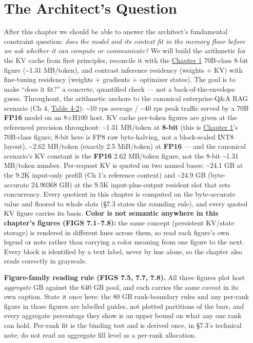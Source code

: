 \section*{The Architect's Question}\label{the-architects-question}

After this chapter we should be able to answer the architect's
fundamental constraint question: \emph{does the model and its context
fit in the memory floor before we ask whether it can compute or
communicate?} We will build the arithmetic for the KV cache from first
principles, reconcile it with the \hyperref[chap:1]{Chapter 1} 70B-class 8-bit figure
(\textasciitilde1.31 MB/token), and contrast inference residency
(weights + KV) with fine-tuning residency (weights + gradients +
optimizer states). The goal is to make ``does it fit?'' a concrete,
quantified check --- not a back-of-the-envelope guess. Throughout, the
arithmetic anchors to the canonical enterprise-Q\&A RAG scenario (Ch 4,
\hyperref[tab:4.2]{Table 4-2}): \textasciitilde10 rps average / \textasciitilde40 rps peak
traffic served by a 70B \textbf{FP16} model on an 8×H100 host. KV cache
per-token figures are given at the referenced precision throughout:
\textasciitilde1.31 MB/token at \textbf{8-bit} (this is \hyperref[chap:1]{Chapter 1}'s
70B-class figure; 8-bit here is FP8 raw byte-halving, not a block-scaled
INT8 layout), \textasciitilde2.62 MB/token (exactly 2.5 MiB/token) at
\textbf{FP16} --- and the canonical scenario's KV constant is the
\textbf{FP16} 2.62 MB/token figure, not the 8-bit \textasciitilde1.31
MB/token number. Per-request KV is quoted on two named bases:
\textasciitilde24.1 GB at the 9.2K input-only prefill (Ch 1's reference
context) and \textasciitilde24.9 GB (byte-accurate 24.90368 GB) at the
9.5K input-plus-output resident slot that sets concurrency. Every
quotient in this chapter is computed on the byte-accurate value and
floored to whole slots (§7.3 states the rounding rule), and every quoted
KV figure carries its basis. \textbf{Color is not semantic anywhere in
this chapter's figures (FIGS 7.1--7.8):} the same concept (persistent
KV/state storage) is rendered in different hues across them, so read
each figure's own legend or note rather than carrying a color meaning
from one figure to the next. Every block is identified by a text label,
never by hue alone, so the chapter also reads correctly in grayscale.

\textbf{Figure-family reading rule (FIGS 7.5, 7.7, 7.8).} All three
figures plot host \emph{aggregate} GB against the 640 GB pool, and each
carries the same caveat in its own caption. State it once here: the 80
GB rank-boundary rules and any per-rank figure in those figures are
labelled guides, not plotted partitions of the bars, and every aggregate
percentage they show is an upper bound on what any one rank can hold.
Per-rank fit is the binding test and is derived once, in §7.3's
technical note; do not read an aggregate fill level as a per-rank
allocation.

